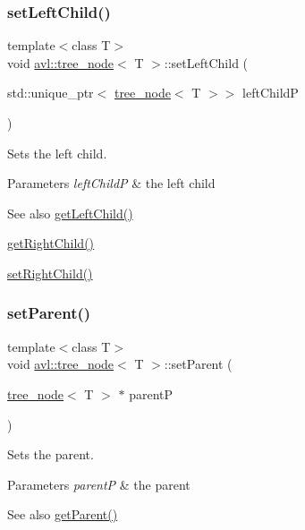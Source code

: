 \subsubsection{\texorpdfstring{set\+Left\+Child()}{setLeftChild()}}
{\footnotesize\ttfamily template$<$class T$>$ \\
void \hyperlink{classavl_1_1tree__node}{avl\+::tree\+\_\+node}$<$ T $>$\+::set\+Left\+Child (\begin{DoxyParamCaption}\item[{std\+::unique\+\_\+ptr$<$ \hyperlink{classavl_1_1tree__node}{tree\+\_\+node}$<$ T $>$$>$}]{left\+ChildP }\end{DoxyParamCaption})\hspace{0.3cm}{\ttfamily [inline]}}

Sets the left child. 
\begin{DoxyParams}{Parameters}
{\em left\+ChildP} & the left child \\
\hline
\end{DoxyParams}
\begin{DoxySeeAlso}{See also}
\hyperlink{classavl_1_1tree__node_ad12a5f6a41cfc6203913c5b6bce30837}{get\+Left\+Child()} 

\hyperlink{classavl_1_1tree__node_ac79592e64351573e622d0977002fc813}{get\+Right\+Child()} 

\hyperlink{classavl_1_1tree__node_a09a51bcee333bbd509e3edb96179ae7e}{set\+Right\+Child()} 
\end{DoxySeeAlso}
\mbox{\label{classavl_1_1tree__node_a9b62ceb3999608be2e85569208668b08}} 
\subsubsection{\texorpdfstring{set\+Parent()}{setParent()}}
{\footnotesize\ttfamily template$<$class T$>$ \\
void \hyperlink{classavl_1_1tree__node}{avl\+::tree\+\_\+node}$<$ T $>$\+::set\+Parent (\begin{DoxyParamCaption}\item[{\hyperlink{classavl_1_1tree__node}{tree\+\_\+node}$<$ T $>$ $\ast$}]{parentP }\end{DoxyParamCaption})\hspace{0.3cm}{\ttfamily [inline]}}

Sets the parent. 
\begin{DoxyParams}{Parameters}
{\em parentP} & the parent \\
\hline
\end{DoxyParams}
\begin{DoxySeeAlso}{See also}
\hyperlink{classavl_1_1tree__node_a3350faeaf03433fc236ffe811b41b04f}{get\+Parent()} 
\end{DoxySeeAlso}
\mbox{\label{classavl_1_1tree__node_a09a51bcee333bbd509e3edb96179ae7e}} 
